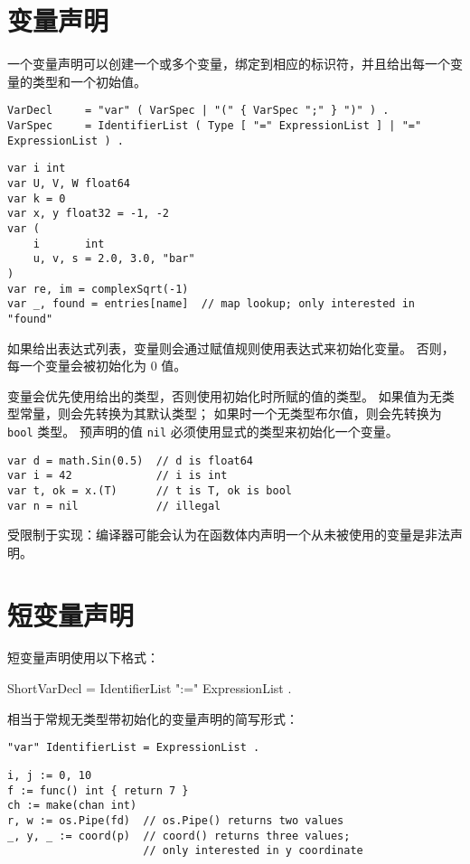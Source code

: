 \section{变量声明}
一个变量声明可以创建一个或多个变量，绑定到相应的标识符，并且给出每一个变量的类型和一个初始值。
\begin{lstlisting}[style=EBNF]
VarDecl     = "var" ( VarSpec | "(" { VarSpec ";" } ")" ) .
VarSpec     = IdentifierList ( Type [ "=" ExpressionList ] | "=" ExpressionList ) .
\end{lstlisting}

\begin{lstlisting}[style=golang]
var i int
var U, V, W float64
var k = 0
var x, y float32 = -1, -2
var (
	i       int
	u, v, s = 2.0, 3.0, "bar"
)
var re, im = complexSqrt(-1)
var _, found = entries[name]  // map lookup; only interested in "found"
\end{lstlisting}
如果给出表达式列表，变量则会通过赋值规则使用表达式来初始化变量。
否则，每一个变量会被初始化为 0 值。

变量会优先使用给出的类型，否则使用初始化时所赋的值的类型。
如果值为无类型常量，则会先转换为其默认类型；
如果时一个无类型布尔值，则会先转换为 \lstinline|bool| 类型。
预声明的值 \lstinline|nil| 必须使用显式的类型来初始化一个变量。
\begin{lstlisting}[style=golang]
var d = math.Sin(0.5)  // d is float64
var i = 42             // i is int
var t, ok = x.(T)      // t is T, ok is bool
var n = nil            // illegal
\end{lstlisting}

受限制于实现：编译器可能会认为在函数体内声明一个从未被使用的变量是非法声明。

\section{短变量声明}\label{sec:shortVarDeclare}
短变量声明使用以下格式：
\begin{EBNF}
ShortVarDecl = IdentifierList ":=" ExpressionList .
\end{EBNF}
相当于常规无类型带初始化的变量声明的简写形式：
\begin{lstlisting}[style=EBNF]
"var" IdentifierList = ExpressionList .
\end{lstlisting}

\begin{lstlisting}[style=golang]
i, j := 0, 10
f := func() int { return 7 }
ch := make(chan int)
r, w := os.Pipe(fd)  // os.Pipe() returns two values
_, y, _ := coord(p)  // coord() returns three values; 
					 // only interested in y coordinate
\end{lstlisting}

